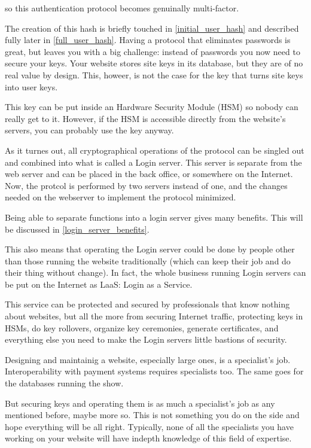so this authentication protocol becomes genuinally multi-factor.
\par
The creation of this hash is briefly touched in \ref{initial_user_hash} and described fully later in \ref{full_user_hash}.
Having a protocol that eliminates passwords is great, but leaves you with a big challenge: instead of passwords you now need to secure your keys.
Your website stores site keys in its database, but they are of no real value by design.
This, howeer, is not the case for the key that turns site keys into user keys.
\par
This key can be put inside an Hardware Security Module (HSM) so nobody can really get to it.
However, if the HSM is accessible directly from the website's servers, you can probably use the key anyway.
\par
As it turnes out, all cryptographical operations of the protocol can be singled out and combined into what is called a Login server.
This server is separate from the web server and can be placed in the back office, or somewhere on the Internet.
Now, the protcol is performed by two servers instead of one, and the changes needed on the webserver to implement the protocol minimized.
\par
Being able to separate functions into a login server gives many benefits.
This will be discussed in \ref{login_server_benefits}.
\par

This also means that operating the Login server could be done by people other than those running the website traditionally
(which can keep their job and do their thing without change).
In fact, the whole business running Login servers can be put on the Internet as LaaS: Login as a Service.
\par
This service can be protected and secured by professionals that know nothing about websites,
but all the more from securing Internet traffic,
protecting keys in HSMs,
do key rollovers,
organize key ceremonies,
generate certificates,
and everything else you need to make the Login servers little bastions of security.

Designing and maintainig a website, especially large ones, is a specialist's job.
Interoperability with payment systems requires specialists too.
The same goes for the databases running the show.
\par
But securing keys and operating them is as much a specialist's job as any mentioned before, maybe more so.
This is not something you do on the side and hope everything will be all right.
Typically, none of all the specialists you have working on your website will have indepth knowledge of this field of expertise.


